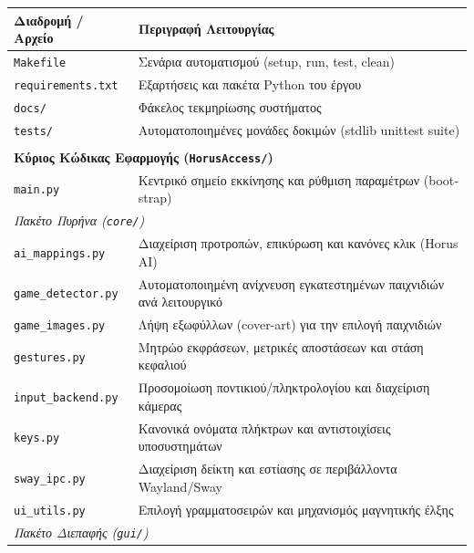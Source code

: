 \documentclass[twoside, a4paper, 11pt]{article}
\newcommand{\textlatin}[1]{\textenglish{#1}}
\begin{document}
\begin{table}[htbp]
    \centering
    \small
    \begin{tabular}{|l|p{8.5cm}|}
        \hline
        \textbf{Διαδρομή / Αρχείο} & \textbf{Περιγραφή Λειτουργίας} \\ \hline
        \texttt{Makefile} & Σενάρια αυτοματισμού (\textlatin{setup, run, test, clean}) \\ \hline
        \texttt{requirements.txt} & Εξαρτήσεις και πακέτα Python του έργου \\ \hline
        \texttt{docs/} & Φάκελος τεκμηρίωσης συστήματος \\ \hline
        \texttt{tests/} & Αυτοματοποιημένες μονάδες δοκιμών (\textlatin{stdlib unittest suite}) \\ \hline
        \multicolumn{2}{l}{} \\[-0.5em] %
        \multicolumn{2}{l}{\textbf{Κύριος Κώδικας Εφαρμογής (\texttt{HorusAccess/})}} \\ \hline
        \texttt{main.py} & Κεντρικό σημείο εκκίνησης και ρύθμιση παραμέτρων (\textlatin{bootstrap}) \\ \hline
        \multicolumn{2}{l|}{\textit{Πακέτο Πυρήνα (\texttt{core/})}} \\ \hline
        \texttt{ai\_mappings.py} & Διαχείριση προτροπών, επικύρωση και κανόνες κλικ (\textlatin{Horus AI}) \\ \hline
        \texttt{game\_detector.py} & Αυτοματοποιημένη ανίχνευση εγκατεστημένων παιχνιδιών ανά λειτουργικό \\ \hline
        \texttt{game\_images.py} & Λήψη εξωφύλλων (\textlatin{cover-art}) για την επιλογή παιχνιδιών \\ \hline
        \texttt{gestures.py} & Μητρώο εκφράσεων, μετρικές αποστάσεων και στάση κεφαλιού \\ \hline
        \texttt{input\_backend.py} & Προσομοίωση ποντικιού/πληκτρολογίου και διαχείριση κάμερας \\ \hline
        \texttt{keys.py} & Κανονικά ονόματα πλήκτρων και αντιστοιχίσεις υποσυστημάτων \\ \hline
        \texttt{sway\_ipc.py} & Διαχείριση δείκτη και εστίασης σε περιβάλλοντα Wayland/Sway \\ \hline
        \texttt{ui\_utils.py} & Επιλογή γραμματοσειρών και μηχανισμός μαγνητικής έλξης \\ \hline
        \multicolumn{2}{l|}{\textit{Πακέτο Διεπαφής (\texttt{gui/})}} \\ \hline

\end{tabular}
\end{table}
\end{document}
